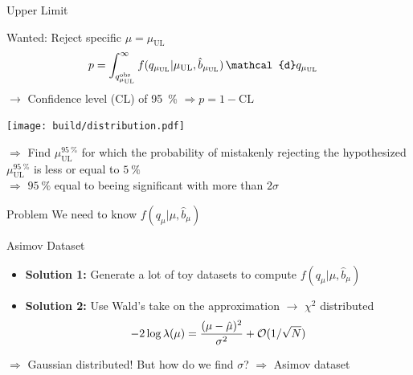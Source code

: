\documentclass[aspectratio=1610, 9pt]{beamer}
\begin{document}
\begin{frame}{Upper Limit}
    \begin{minipage}{0.49\textwidth}
        \Large
        Wanted: Reject specific $\mu = \mu_\text{UL}$\\
        \centering
        \begin{align}
            p &= \int_{q_{\mu_\text{UL}}^\text{obs}}^\infty f(q_{\mu_\text{UL}}\vert \mu_\text{UL},\hat{b}_{\mu_\text{UL}})\,\mathcal{d}q_{\mu_\text{UL}} \notag
        \end{align}
        $\rightarrow$ Confidence level (CL) of \SI{95}{\percent} $\Rightarrow p = 1-\text{CL}$ 
    \end{minipage}
    \hfill
    \begin{minipage}{0.5\textwidth}
        \texttt{[image: build/distribution.pdf]}
    \end{minipage}
    \centering
    \Large
$\Rightarrow$ Find $\mu^{\SI{95}{\percent}}_\text{UL}$ for which the probability of mistakenly rejecting the hypothesized $\mu^{\SI{95}{\percent}}_\text{UL}$ is less or equal to $\SI{5}{\percent}$\\
    $\Rightarrow$ $\SI{95}{\percent}$ equal to beeing significant with more than $2\sigma$
\end{frame}

\begin{frame}{Problem}
    \Huge
    \centering
    \textcolor{tuorange}{We need to know $f(q_\mu\vert \mu,\hat{b}_\mu)$}
\end{frame}


\begin{frame}{Asimov Dataset}
    \Large
    \begin{itemize}
        \item \textbf{Solution 1:} Generate a lot of toy datasets to compute $f(q_\mu\vert \mu,\hat{b}_\mu)$
        \item \textbf{Solution 2:} Use Wald's take on the approximation $\rightarrow$ $\chi^2$ distributed \\
            \begin{align}
                -2\log{\lambda(\mu)} = \frac{(\mu-\hat{\mu})^2}{\sigma^2} + \mathcal{O}(1/\sqrt{N}) \notag
            \end{align}
    \end{itemize}
    $\Rightarrow$ Gaussian distributed! But how do we find $\sigma$? $\Rightarrow$ Asimov dataset
\end{frame}
\end{document}
